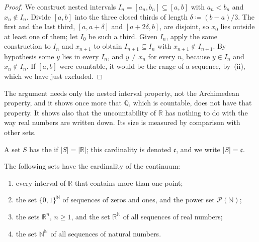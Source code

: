 \begin{proof}
We construct nested intervals $I_n=[a_n,b_n]\subseteq[a,b]$ with $a_n<b_n$ and $x_n\notin I_n$. Divide $[a,b]$ into the three closed thirds of length $\delta\coloneqq(b-a)/3$. The first and the last third, $[a,a+\delta]$ and $[a+2\delta,b]$, are disjoint, so $x_0$ lies outside at least one of them; let $I_0$ be such a third. Given $I_n$, apply the same construction to $I_n$ and $x_{n+1}$ to obtain $I_{n+1}\subseteq I_n$ with $x_{n+1}\notin I_{n+1}$. By hypothesis some $y$ lies in every $I_n$, and $y\ne x_n$ for every $n$, because $y\in I_n$ and $x_n\notin I_n$. If $[a,b]$ were countable, it would be the range of a sequence, by \,(ii), which we have just excluded.
\end{proof}

The argument needs only the nested interval property, not the Archimedean property, and it shows once more that $\mathbb Q$, which is countable, does not have that property. It shows also that the uncountability of $\mathbb R$ has nothing to do with the way real numbers are written down. Its size is measured by comparison with other sets.

A set $S$ has the  if $|S|=|\mathbb R|$; this cardinality is denoted $\mathfrak c$, and we write $|S|=\mathfrak c$.

\begin{theorem}
\label{thm:continuum-sets}
The following sets have the cardinality of the continuum:
\begin{enumerate}
\item every interval of $\mathbb R$ that contains more than one point;
\item the set $\{0,1\}^{\mathbb N}$ of sequences of zeros and ones, and the power set $\mathcal P(\mathbb N)$;
\item the sets $\mathbb R^n$, $n\ge1$, and the set $\mathbb R^{\mathbb N}$ of all sequences of real numbers;
\item the set $\mathbb N^{\mathbb N}$ of all sequences of natural numbers.
\end{enumerate}
\end{theorem}

